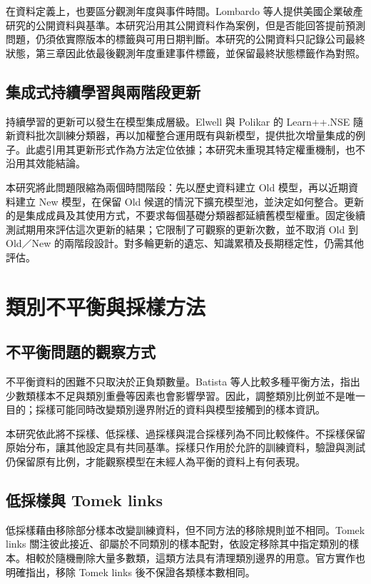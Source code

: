 在資料定義上，也要區分觀測年度與事件時間。Lombardo 等人\autocite{lombardo2022bankruptcy}提供美國企業破產研究的公開資料與基準。本研究沿用其公開資料作為案例，但是否能回答提前預測問題，仍須依實際版本的標籤與可用日期判斷。本研究的公開資料只記錄公司最終狀態，第三章因此依最後觀測年度重建事件標籤，並保留最終狀態標籤作為對照。

\subsection{集成式持續學習與兩階段更新}

持續學習的更新可以發生在模型集成層級。Elwell 與 Polikar\autocite{elwell2011incremental} 的 Learn++.NSE 隨新資料批次訓練分類器，再以加權整合運用既有與新模型，提供批次增量集成的例子。此處引用其更新形式作為方法定位依據；本研究未重現其特定權重機制，也不沿用其效能結論。

本研究將此問題限縮為兩個時間階段：先以歷史資料建立 Old 模型，再以近期資料建立 New 模型，在保留 Old 候選的情況下擴充模型池，並決定如何整合。更新的是集成成員及其使用方式，不要求每個基礎分類器都延續舊模型權重。固定後續測試期用來評估這次更新的結果；它限制了可觀察的更新次數，並不取消 Old 到 Old／New 的兩階段設計。對多輪更新的遺忘、知識累積及長期穩定性，仍需其他評估。

\section{類別不平衡與採樣方法}

\subsection{不平衡問題的觀察方式}

不平衡資料的困難不只取決於正負類數量。Batista 等人\autocite{batista2004balancing}比較多種平衡方法，指出少數類樣本不足與類別重疊等因素也會影響學習。因此，調整類別比例並不是唯一目的；採樣可能同時改變類別邊界附近的資料與模型接觸到的樣本資訊。

本研究依此將不採樣、低採樣、過採樣與混合採樣列為不同比較條件。不採樣保留原始分布，讓其他設定具有共同基準。採樣只作用於允許的訓練資料，驗證與測試仍保留原有比例，才能觀察模型在未經人為平衡的資料上有何表現。

\subsection{低採樣與 Tomek links}

低採樣藉由移除部分樣本改變訓練資料，但不同方法的移除規則並不相同。Tomek links 關注彼此接近、卻屬於不同類別的樣本配對，依設定移除其中指定類別的樣本。相較於隨機刪除大量多數類，這類方法具有清理類別邊界的用意。官方實作也明確指出，移除 Tomek links 後不保證各類樣本數相同\autocite{imblearn-tomek-docs}。

